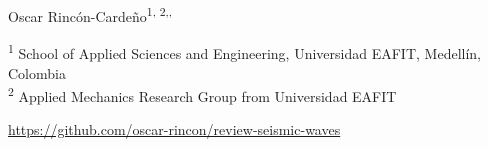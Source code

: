 \documentclass[11pt,twoside]{article}
\begin{document}

{\begin{center}
Oscar Rincón-Cardeño\textsuperscript{1, 2,\href{https://orcid.org/0000-0002-5308-9710}{\aiOrcid},
\href{https://github.com/oscar-rincon}{\faGithubSquare}}
\end{center}
}

\vspace{-0.3cm}

{\footnotesize
\noindent\textsuperscript{1} School of Applied Sciences and Engineering, Universidad EAFIT, 
Medellín, Colombia\\
\noindent\textsuperscript{2} Applied Mechanics Research Group from Universidad EAFIT
}


{\noindent\footnotesize{\href{https://github.com/oscar-rincon/review-seismic-waves}
{\faGithubSquare \href{https://github.com/oscar-rincon/review-seismic-waves}{ https://github.com/oscar-rincon/review-seismic-waves}}
}
}


\end{document}

